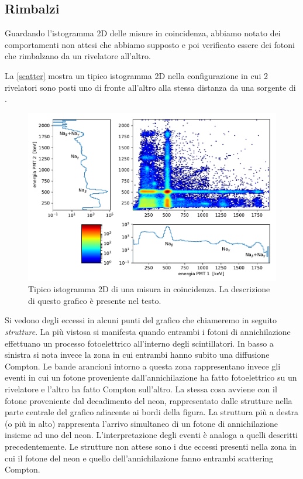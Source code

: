 \subsection{Rimbalzi}

Guardando l'istogramma 2D delle misure in coincidenza, abbiamo notato dei comportamenti non attesi che abbiamo supposto e poi verificato essere dei fotoni che rimbalzano da un rivelatore all'altro.

La \autoref{scatter} mostra un tipico istogramma 2D
nella configurazione in cui 2 rivelatori sono posti uno di fronte all'altro alla stessa distanza da una sorgente di \na{}.

\begin{figure}[h]
\centering
\includegraphics[width=\textwidth]{immagini/esempio}
\caption{Tipico istogramma 2D di una misura in coincidenza. La descrizione di questo grafico è presente nel testo.}
\label{scatter}
\end{figure}

Si vedono degli eccessi in alcuni punti del grafico che chiameremo in seguito \emph{strutture}. La più vistosa si manifesta quando entrambi i fotoni di annichilazione effettuano un processo fotoelettrico all'interno degli scintillatori. In basso a sinistra si nota invece la zona in cui entrambi hanno subito una diffusione Compton. Le bande arancioni intorno a questa zona rappresentano invece gli eventi in cui un fotone proveniente dall'annichilazione ha fatto fotoelettrico su un rivelatore e l'altro ha fatto Compton sull'altro.
La stessa cosa avviene con il fotone proveniente dal decadimento del neon, rappresentato dalle strutture nella parte centrale del grafico adiacente ai bordi della figura. La struttura più a destra (o più in alto) rappresenta l'arrivo simultaneo di un fotone di annichilazione insieme ad uno del neon. L'interpretazione degli eventi è analoga a quelli descritti precedentemente.
Le strutture non attese sono i due eccessi presenti nella zona in cui il fotone del neon e quello dell'annichilazione fanno entrambi scattering Compton.


